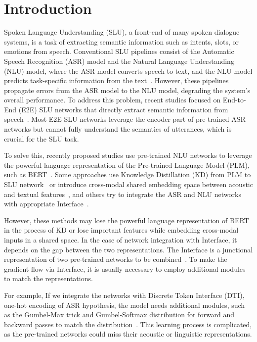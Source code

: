 \documentclass{article}
\begin{document}
\vspace{-6mm}
\section{Introduction}

Spoken Language Understanding (SLU), a front-end of many spoken dialogue systems, is a task of extracting semantic information such as intents, slots, or emotions from speech. Conventional SLU pipelines consist of the Automatic Speech Recognition (ASR) model and the Natural Language Understanding (NLU) model, where the ASR model converts speech to text, and the NLU model predicts task-specific information from the text~\cite{tur2011spoken}.
However, these pipelines propagate errors from the ASR model to the NLU model, degrading the system's overall performance.
To address this problem, recent studies focused on End-to-End (E2E) SLU networks that directly extract semantic information from speech~\cite{serdyuk2018towards,Lugosch2019}. Most E2E SLU networks leverage the encoder part of pre-trained ASR networks but cannot fully understand the semantics of utterances, which is crucial for the SLU task.

To solve this, recently proposed studies use pre-trained NLU networks to leverage the powerful language representation of the Pre-trained Language Model (PLM), such as BERT~\cite{devlin2019bert}. Some approaches use Knowledge Distillation (KD) from PLM to SLU network~\cite{Cho2020,kim2021two} or introduce cross-modal shared embedding space between acoustic and textual features~\cite{agrawal2020tie,huang2020leveraging,kim2021st}, and others try to integrate the ASR and NLU networks with appropriate Interface~\cite{lai2020towards,rao2021mean}. 

However, these methods may lose the powerful language representation of BERT in the process of KD or lose important features while embedding cross-modal inputs in a shared space.
In the case of network integration with Interface, it depends on the gap between the two representations.
The Interface is a junctional representation of two pre-trained networks to be combined~\cite{rao2021mean}. 
To make the gradient flow via Interface, it is usually necessary to employ additional modules to match the representations.


For example, If we integrate the networks with Discrete Token Interface (DTI), one-hot encoding of ASR hypothesis, the model needs additional modules, such as the Gumbel-Max trick and Gumbel-Softmax distribution for forward and backward passes to match the distribution~\cite{jang2017categorical}. 
This learning process is complicated, as the pre-trained networks could miss their acoustic or linguistic representations.
\end{document}
